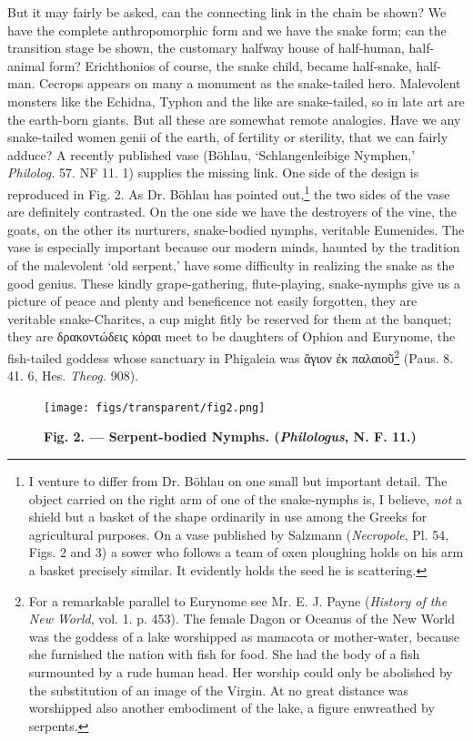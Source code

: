 \documentclass[a4paper, 11pt, oneside, polutonikogreek, english]{article}
\begin{document}
But it may fairly be asked, can the connecting link in the chain be shown? We have the complete anthropomorphic form and we have the snake form; can the transition stage be shown, the customary halfway house of half-human, half-animal form? Erichthonios of course, the snake child, became half-snake, half-man. Cecrops appears on many a monument as the snake-tailed hero. Malevolent monsters like the Echidna, Typhon and the like are snake-tailed, so in late art are the earth-born giants. But all these are somewhat remote analogies. Have we any snake-tailed women genii of the earth, of fertility or sterility, that we can fairly adduce? A recently published vase (Böhlau, `Schlangenleibige Nymphen,' \emph{Philolog.} 57. NF 11. 1) supplies the missing link. One side of the design is reproduced in Fig. 2. As Dr. Böhlau has pointed out,\footnote{I venture to differ from Dr. Böhlau on one small but important detail. The object carried on the right arm of one of the snake-nymphs is, I believe, \emph{not} a shield but a basket of the shape ordinarily in use among the Greeks for agricultural purposes. On a vase published by Salzmann (\emph{Necropole}, Pl. 54, Figs. 2 and 3) a sower who follows a team of oxen ploughing holds on his arm a basket precisely similar. It evidently holds the seed he is scattering.} the two sides of the vase are definitely contrasted. On the one side we have the destroyers of the vine, the goats, on the other its nurturers, snake-bodied nymphs, veritable Eumenides. The vase is especially important because our modern minds, haunted by the tradition of the malevolent `old serpent,' have some difficulty in realizing the snake as the good genius. These kindly grape-gathering, flute-playing, snake-nymphs give us a picture of peace and plenty and beneficence not easily forgotten, they are veritable snake-Charites, a cup might fitly be reserved for them at the banquet; they are δρακοντώδεις κόραι meet to be daughters of Ophion and Eurynome, the fish-tailed goddess whose sanctuary in Phigaleia was ἅγιον ἐκ παλαιοῦ\footnote{For a remarkable parallel to Eurynome see Mr. E. J. Payne (\emph{History of the New World}, vol. 1. p. 453). The female Dagon or Oceanus of the New World was the goddess of a lake worshipped as mamacota or mother-water, because she furnished the nation with fish for food. She had the body of a fish surmounted by a rude human head. Her worship could only be abolished by the substitution of an image of the Virgin. At no great distance was worshipped also another embodiment of the lake, a figure enwreathed by serpents.} (Paus. 8. 41. 6, Hes. \emph{Theog.} 908).
\begin{figure}[H]
\centering
\texttt{[image: figs/transparent/fig2.png]}
\caption{\bfseries Fig. 2. --- Serpent-bodied Nymphs. (\emph{Philologus}, N. F. 11.)}
\end{figure}
\end{document}
